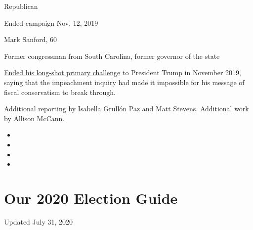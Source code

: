 Republican

Ended campaign Nov. 12, 2019

Mark Sanford, 60

Former congressman from South Carolina, former governor of the state

\href{https://www.nytimes3xbfgragh.onion/2019/11/12/us/politics/mark-sanford-2020.html}{Ended
his long-shot primary challenge} to President Trump in November 2019,
saying that the impeachment inquiry had made it impossible for his
message of fiscal conservatism to break through.

Additional reporting by Isabella Grullón Paz and Matt Stevens.
Additional work by Allison McCann.

\begin{itemize}
\item
\item
\item
\item
\end{itemize}

\hypertarget{our-2020-election-guide}{%
\section{Our 2020 Election Guide}\label{our-2020-election-guide}}

Updated July 31, 2020

